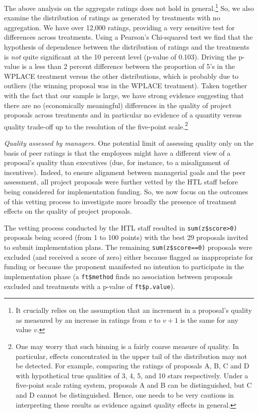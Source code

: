 \documentclass[11pt, titlepage]{article}
\begin{document}
The above analysis on the aggregate ratings does not hold in
general.\footnote{It crucially relies on the assumption that an
  increment in a proposal's quality as measured by an increase in
  ratings from \(v\) to \(v+1\) is the same for any value \(v\).} So, we
also examine the distribution of ratings as generated by treatments with
no aggregation. We have over 12,000 ratings, providing a very sensitive
test for differences across treatments. Using a Pearson's Chi-squared
test we find that the hypothesis of dependence between the distribution
of ratings and the treatments is \emph{not} quite significant at the 10
percent level (p-value of 0.103). Driving the p-value is a less than
\(2\) percent difference between the proportion of 5's in the WPLACE
treatment versus the other distributions, which is probably due to
outliers (the winning proposal was in the WPLACE treatment). Taken
together with the fact that our sample is large, we have strong evidence
suggesting that there are no (economically meaningful) differences in
the quality of project proposals across treatments and in particular no
evidence of a quantity versus quality trade-off up to the resolution of
the five-point scale.\footnote{One may worry that such binning is a
  fairly coarse measure of quality. In particular, effects concentrated
  in the upper tail of the distribution may not be detected. For
  example, comparing the ratings of proposals A, B, C and D with
  hypothetical true qualities of 3, 4, 5, and 10 stars respectively.
  Under a five-point scale rating system, proposals A and B can be
  distinguished, but C and D cannot be distinguished. Hence, one needs
  to be very cautious in interpreting these results as evidence against
  quality effects in general.}

\emph{Quality assessed by managers.} One potential limit of assessing
quality only on the basis of peer ratings is that the employees might
have a different view of a proposal's quality than executives (due, for
instance, to a misalignment of incentives). Indeed, to ensure alignment
between managerial goals and the peer assessment, all project proposals
were further vetted by the HTL staff before being considered for
implementation funding. So, we now focus on the outcomes of this vetting
process to investigate more broadly the presence of treatment effects on
the quality of project proposals.

The vetting process conducted by the HTL staff resulted in
\texttt{sum(z\$score\textgreater{}0)} proposals being scored (from 1 to
100 points) with the best 29 proposals invited to submit implementation
plans. The remaining \texttt{sum(z\$score==0)} proposals were excluded
(and received a score of zero) either because flagged as inappropriate
for funding or because the proponent manifested no intention to
participate in the implementation phase (a \texttt{ft\$method} finds no
association between proposals excluded and treatments with a p-value of
\texttt{ft\$p.value}).
\end{document}
